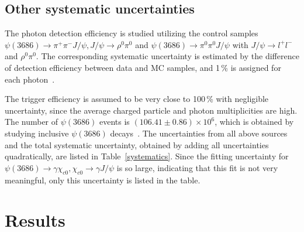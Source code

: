 \documentclass[aps,prd,twocolumn,showpacs,floatfix,byrevtex]{revtex4-1}
\begin{document}
\subsection{Other systematic uncertainties}

The photon detection efficiency is studied utilizing the control
samples $\psi(3686) \to \pi^+\pi^- J/\psi, J/\psi \to \rho^0\pi^0$ and
$\psi(3686) \to \pi^0\pi^0 J/\psi$ with $J/\psi \to l^+l^-$ and
$\rho^0\pi^0$.  The corresponding systematic uncertainty is estimated
by the difference of detection efficiency between data and MC samples,
and 1\,\% is assigned for each photon~\cite{photon_eff}.

The trigger efficiency is assumed to be very close to 100\,\% with
negligible uncertainty, since the average charged particle and photon
multiplicities are high. The number of $\psi(3686)$ events is $(106.41
\pm 0.86) \times 10^6$, which is obtained by studying inclusive
$\psi(3686)$ decays~\cite{Npsip}.  The uncertainties from all above
sources and the total systematic uncertainty, obtained by adding all
uncertainties quadratically, are listed in Table~\ref{systematics}.
Since the fitting uncertainty for $\psi(3686) \to \gamma \chi_{c0},
\chi_{c0} \to \gamma J/\psi$ is so large, indicating that this fit is
not very meaningful, only this uncertainty is listed in the table.

\section{Results}
\label{results}
\end{document}
